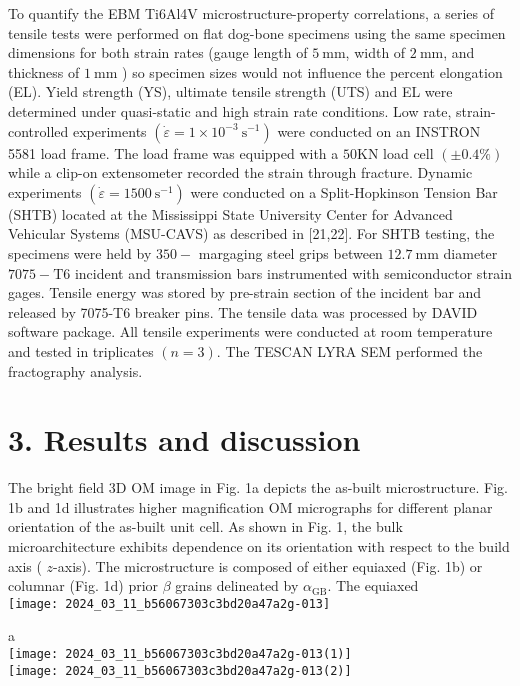 \documentclass[10pt]{article}
\begin{document}
To quantify the EBM Ti6Al4V microstructure-property correlations, a series of tensile tests were performed on flat dog-bone specimens using the same specimen dimensions for both strain rates (gauge length of $5 \mathrm{~mm}$, width of $2 \mathrm{~mm}$, and thickness of $1 \mathrm{~mm}$ ) so specimen sizes would not influence the percent elongation (EL). Yield strength (YS), ultimate tensile strength (UTS) and EL were determined under quasi-static and high strain rate conditions. Low rate, strain-controlled experiments $\left(\dot{\varepsilon}=1 \times 10^{-3} \mathrm{~s}^{-1}\right)$ were conducted on an INSTRON 5581 load frame. The load frame was equipped with a $50 \mathrm{KN}$ load cell $( \pm 0.4 \%)$ while a clip-on extensometer recorded the strain through fracture. Dynamic experiments $\left(\dot{\varepsilon}=1500 \mathrm{~s}^{-1}\right)$ were conducted on a Split-Hopkinson Tension Bar (SHTB) located at the Mississippi State University Center for Advanced Vehicular Systems (MSU-CAVS) as described in [21,22]. For SHTB testing, the specimens were held by $350-$ margaging steel grips between $12.7 \mathrm{~mm}$ diameter $7075-\mathrm{T6}$ incident and transmission bars instrumented with semiconductor strain gages. Tensile energy was stored by pre-strain section of the incident bar and released by 7075-T6 breaker pins. The tensile data was processed by DAVID software package. All tensile experiments were conducted at room temperature and tested in triplicates $(n=3)$. The TESCAN LYRA SEM performed the fractography analysis.

\section*{3. Results and discussion}
The bright field 3D OM image in Fig. 1a depicts the as-built microstructure. Fig. 1b and 1d illustrates higher magnification $\mathrm{OM}$ micrographs for different planar orientation of the as-built unit cell. As shown in Fig. 1, the bulk microarchitecture exhibits dependence on its orientation with respect to the build axis ( $z$-axis). The microstructure is composed of either equiaxed (Fig. 1b) or columnar (Fig. 1d) prior $\beta$ grains delineated by $\alpha_{\mathrm{GB}}$. The equiaxed\\
\texttt{[image: 2024\_03\_11\_b56067303c3bd20a47a2g-013]}

a\\
\texttt{[image: 2024\_03\_11\_b56067303c3bd20a47a2g-013(1)]}\\
\texttt{[image: 2024\_03\_11\_b56067303c3bd20a47a2g-013(2)]}
\end{document}
